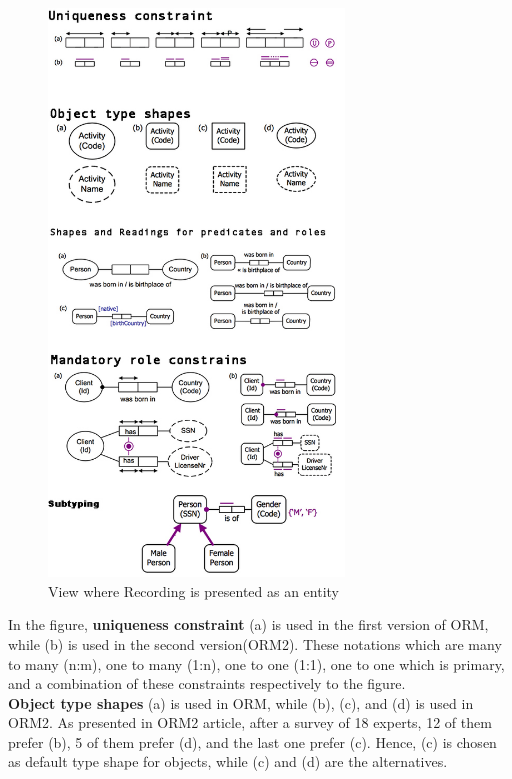 \begin{figure}[ht]
    \centering
    \includegraphics[width=0.7\textwidth]{Figures/USEDORM.png}
    \caption{View where Recording is presented as an entity}
    \label{fig:Figures/USEDORM}
\end{figure}
In the figure, \textbf{uniqueness constraint} (a) is used in the first version of ORM, while (b) is used in the second version(ORM2). These notations which are many to many (n:m), one to many (1:n), one to one (1:1), one to one which is primary, and a combination of these constraints respectively to the figure.\\
\textbf{Object type shapes} (a) is used in ORM, while (b), (c), and (d) is used in ORM2. As presented in ORM2 article\cite{ORMdotNET2}, after a survey of 18 experts, 12 of them prefer (b), 5 of them prefer (d), and the last one prefer (c). Hence, (c) is chosen as default type shape for objects, while (c) and (d) are the alternatives.\\
